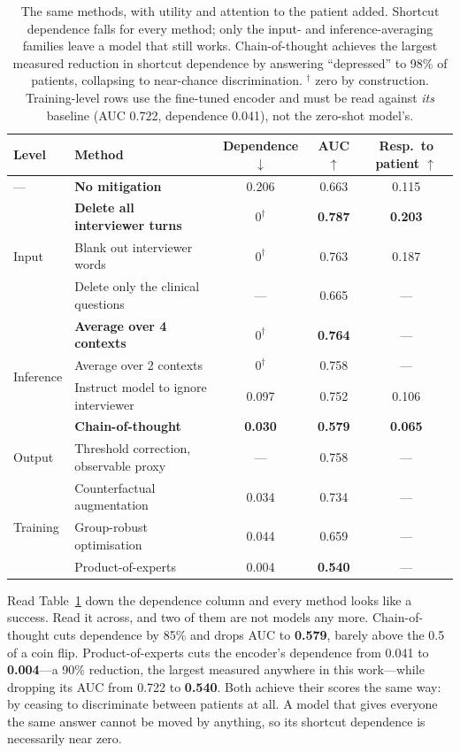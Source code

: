 \documentclass{article}
\begin{document}
\begin{table}[t]
\centering
\caption{The same methods, with utility and attention to the patient added.
Shortcut dependence falls for every method; only the input- and
inference-averaging families leave a model that still works. Chain-of-thought
achieves the largest measured reduction in shortcut dependence by answering
``depressed'' to 98\% of patients, collapsing to near-chance discrimination.
$^\dagger$ zero by construction. Training-level rows use the fine-tuned encoder
and must be read against \emph{its} baseline (AUC 0.722, dependence 0.041), not
the zero-shot model's.}
\label{tab:mitigate}
\begin{tabular}{llccc}
\toprule
Level & Method & Dependence $\downarrow$ & AUC $\uparrow$ & Resp.\ to patient $\uparrow$ \\
\midrule
--- & \textbf{No mitigation} & 0.206 & 0.663 & 0.115 \\
\midrule
\multirow{3}{*}{Input}
 & \textbf{Delete all interviewer turns} & $0^\dagger$ & \textbf{0.787} & \textbf{0.203} \\
 & Blank out interviewer words & $0^\dagger$ & 0.763 & 0.187 \\
 & Delete only the clinical questions & --- & 0.665 & --- \\
\midrule
\multirow{4}{*}{Inference}
 & \textbf{Average over 4 contexts} & $0^\dagger$ & \textbf{0.764} & --- \\
 & Average over 2 contexts & $0^\dagger$ & 0.758 & --- \\
 & Instruct model to ignore interviewer & 0.097 & 0.752 & 0.106 \\
 & \textbf{Chain-of-thought} & \textbf{0.030} & \textbf{0.579} & \textbf{0.065} \\
\midrule
Output & Threshold correction, observable proxy & --- & 0.758 & --- \\
\midrule
\multirow{3}{*}{Training}
 & Counterfactual augmentation & 0.034 & 0.734 & --- \\
 & Group-robust optimisation & 0.044 & 0.659 & --- \\
 & Product-of-experts & 0.004 & \textbf{0.540} & --- \\
\bottomrule
\end{tabular}
\end{table}

Read Table~\ref{tab:mitigate} down the dependence column and every method looks
like a success. Read it across, and two of them are not models any more.
Chain-of-thought cuts dependence by 85\% and drops AUC to \textbf{0.579}, barely
above the 0.5 of a coin flip. Product-of-experts cuts the encoder's dependence
from 0.041 to \textbf{0.004}---a 90\% reduction, the largest measured anywhere in
this work---while dropping its AUC from 0.722 to \textbf{0.540}. Both achieve
their scores the same way: by ceasing to discriminate between patients at all. A
model that gives everyone the same answer cannot be moved by anything, so its
shortcut dependence is necessarily near zero.
\end{document}
